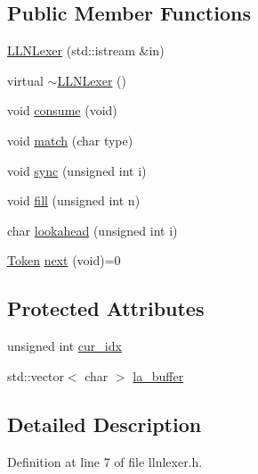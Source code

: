 \subsection*{Public Member Functions}
\begin{DoxyCompactItemize}
\item 
\hyperlink{class_l_l_n_lexer_a80d72ef409a84e097a52ddb6d3cf9843}{L\-L\-N\-Lexer} (std\-::istream \&in)
\item 
virtual \hyperlink{class_l_l_n_lexer_ab4c8e44583f3d144df1379ea4d70b42b}{$\sim$\-L\-L\-N\-Lexer} ()
\item 
void \hyperlink{class_l_l_n_lexer_ada670d39fa588ed793c71fe286ffe01d}{consume} (void)
\item 
void \hyperlink{class_l_l_n_lexer_a4c250c0e032a7cc3e0ffbdcf8c3b18b7}{match} (char type)
\item 
void \hyperlink{class_l_l_n_lexer_a63acbcfa3e703992774a6071a49d1735}{sync} (unsigned int i)
\item 
void \hyperlink{class_l_l_n_lexer_a6a736fa44bf3553a7792d84ab9598eaa}{fill} (unsigned int n)
\item 
char \hyperlink{class_l_l_n_lexer_a66d139156eeb71c9017cfa55acc6ae89}{lookahead} (unsigned int i)
\item 
\hyperlink{class_token}{Token} \hyperlink{class_l_l_n_lexer_a3832522afb32a85b3171f552ff9dd676}{next} (void)=0
\end{DoxyCompactItemize}
\subsection*{Protected Attributes}
\begin{DoxyCompactItemize}
\item 
unsigned int \hyperlink{class_l_l_n_lexer_a6cac67fbdbdc8083f87e1d0938d68ba2}{cur\-\_\-idx}
\item 
std\-::vector$<$ char $>$ \hyperlink{class_l_l_n_lexer_a6e583dda9f354ddb453c277be2cb6edc}{la\-\_\-buffer}
\end{DoxyCompactItemize}


\subsection{Detailed Description}


Definition at line 7 of file llnlexer.\-h.



